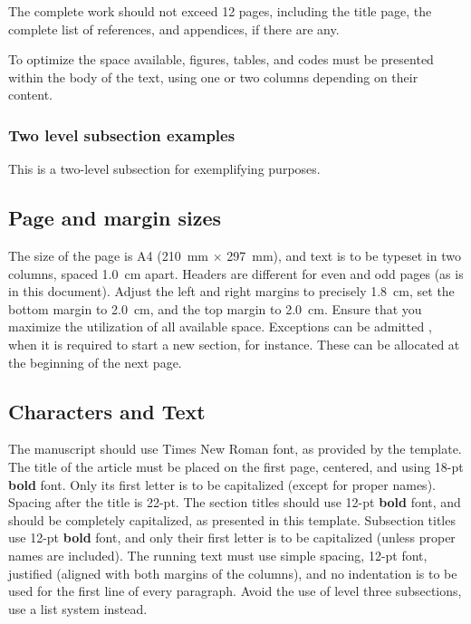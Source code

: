 \documentclass[12pt, a4paper, twoside, twocolumn]{article}
\begin{document}
The complete work should not exceed 12 pages, including the title page, the complete list of references, and appendices, if there are any.

To optimize the space available, figures, tables, and codes must be presented within the body of the text, using one or two columns depending on their content.

\subsubsection{Two level subsection examples}

This is a two-level subsection for exemplifying purposes.

\subsection{Page and margin sizes}

The size of the page is A4 (210~mm $\times$ 297~mm), and text is to be typeset in two columns, spaced 1.0~cm apart. Headers are different for even and odd pages (as is in this document). Adjust the left and right margins to precisely 1.8~cm, set the bottom margin to 2.0~cm, and the top margin to 2.0~cm. Ensure that you maximize the utilization of all available space. Exceptions can be admitted \eg, when it is required to start a new section, for instance. These can be allocated at the beginning of the next page.

\subsection{Characters and Text}

The manuscript should use Times New Roman font, as provided by the template. The title of the article must be placed on the first page, centered, and using 18-pt \textbf{bold} font. Only its first letter is to be capitalized (except for proper names). Spacing after the title is 22-pt. The section titles should use  12-pt \textbf{bold} font, and should be completely capitalized, as presented in this template. Subsection titles use 12-pt \textbf{bold} font, and only their first letter is to be capitalized (unless proper names are included). The running text must use simple spacing, 12-pt font, justified (aligned with both margins of the columns), and no indentation is to be used for the first line of every paragraph. Avoid the use of level three subsections, use a list system instead.
\end{document}
